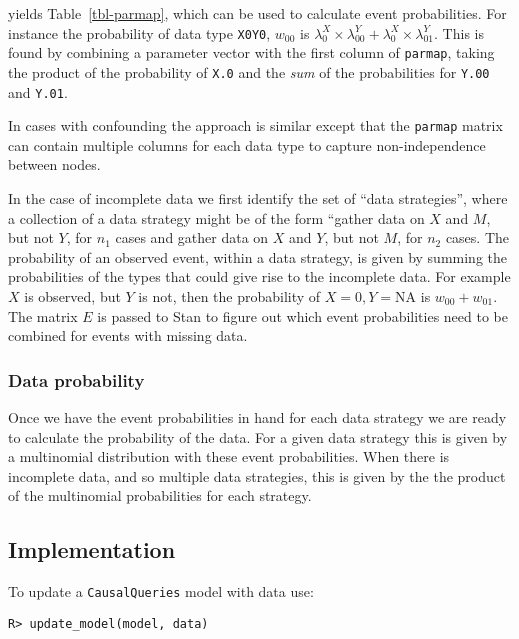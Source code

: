 \documentclass[
  11pt,
  article]{jss}
\begin{document}
yields Table~\ref{tbl-parmap}, which can be used to calculate event
probabilities. For instance the probability of data type \texttt{X0Y0},
\(w_{00}\) is
\(\lambda^X_0\times \lambda^Y_{00} + \lambda^X_0\times \lambda^Y_{01}\).
This is found by combining a parameter vector with the first column of
\texttt{parmap}, taking the product of the probability of \texttt{X.0}
and the \emph{sum} of the probabilities for \texttt{Y.00} and
\texttt{Y.01}.

In cases with confounding the approach is similar except that the
\texttt{parmap} matrix can contain multiple columns for each data type
to capture non-independence between nodes.

In the case of incomplete data we first identify the set of ``data
strategies'', where a collection of a data strategy might be of the form
``gather data on \(X\) and \(M\), but not \(Y\), for \(n_1\) cases and
gather data on \(X\) and \(Y\), but not \(M\), for \(n_2\) cases. The
probability of an observed event, within a data strategy, is given by
summing the probabilities of the types that could give rise to the
incomplete data. For example \(X\) is observed, but \(Y\) is not, then
the probability of \(X=0, Y = \text{NA}\) is \(w_{00} +w_{01}\). The
matrix \(E\) is passed to Stan to figure out which event probabilities
need to be combined for events with missing data.

\hypertarget{data-probability}{%
\subsubsection{Data probability}\label{data-probability}}

Once we have the event probabilities in hand for each data strategy we
are ready to calculate the probability of the data. For a given data
strategy this is given by a multinomial distribution with these event
probabilities. When there is incomplete data, and so multiple data
strategies, this is given by the the product of the multinomial
probabilities for each strategy.

\hypertarget{implementation}{%
\subsection{Implementation}\label{implementation}}

To update a \texttt{CausalQueries} model with data use:

\begin{verbatim}
R> update_model(model, data)
\end{verbatim}
\end{document}
